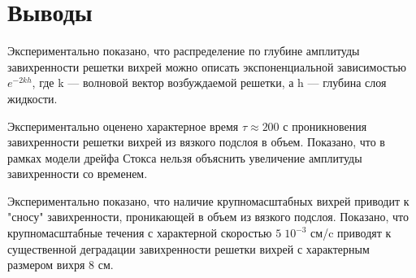 \section{Выводы} \label{sect6_5}
Экспериментально показано, что распределение по глубине амплитуды завихренности решетки вихрей можно описать экспоненциальной зависимостью $e^{-2kh}$, где k — волновой вектор возбуждаемой решетки, а h — глубина слоя жидкости. 

Экспериментально оценено характерное время $\tau \approx 200$ с проникновения завихренности решетки вихрей из вязкого подслоя в объем. Показано, что в рамках модели дрейфа Стокса нельзя объяснить увеличение амплитуды завихренности со временем.

Экспериментально показано, что наличие крупномасштабных вихрей приводит к "сносу" завихренности, проникающей в объем из вязкого подслоя. Показано, что крупномасштабные течения с характерной скоростью $5 \; 10^{-3}$ см/c приводят к существенной деградации завихренности решетки вихрей с характерным размером вихря 8 см.